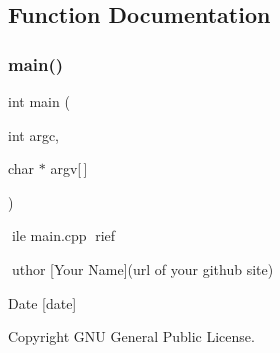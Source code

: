 \subsection{Function Documentation}
\hypertarget{ocra-icub-clients_2standing-demo_2src_2main_8cpp_a0ddf1224851353fc92bfbff6f499fa97}{}\label{ocra-icub-clients_2standing-demo_2src_2main_8cpp_a0ddf1224851353fc92bfbff6f499fa97} 
\subsubsection{\texorpdfstring{main()}{main()}}
{\footnotesize\ttfamily int main (\begin{DoxyParamCaption}\item[{int}]{argc,  }\item[{char $\ast$}]{argv\mbox{[}$\,$\mbox{]} }\end{DoxyParamCaption})}

ile main.\+cpp rief

uthor \mbox{[}Your Name\mbox{]}(url of your github site) \begin{DoxyDate}{Date}
\mbox{[}date\mbox{]} 
\end{DoxyDate}
\begin{DoxyCopyright}{Copyright}
G\+NU General Public License. 
\end{DoxyCopyright}
